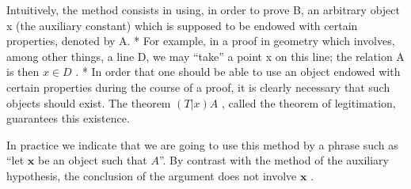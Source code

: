 Intuitively, the method consists in using, in order to prove B, an arbitrary object x (the auxiliary constant) which is supposed to be endowed with certain properties, denoted by A. * For example, in a proof in geometry which involves, among other things, a line D, we may ``take'' a point x on this line; the relation A is then \(x \in D\) . * In order that one should be able to use an object endowed with certain properties during the course of a proof, it is clearly necessary that such objects should exist. The theorem \((T|x)A\) , called the theorem of legitimation, guarantees this existence.

In practice we indicate that we are going to use this method by a phrase such as ``let \(\pmb{x}\) be an object such that \(A\)''. By contrast with the method of the auxiliary hypothesis, the conclusion of the argument does not involve \(\pmb{x}\) .


